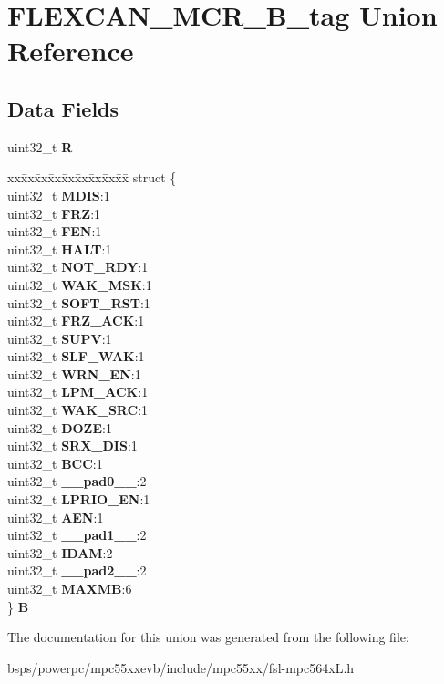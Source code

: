 \hypertarget{unionFLEXCAN__MCR__32B__tag}{}\section{F\+L\+E\+X\+C\+A\+N\+\_\+\+M\+C\+R\+\_\+B\+\_\+tag Union Reference}
\label{unionFLEXCAN__MCR__32B__tag}
\subsection*{Data Fields}
\begin{DoxyCompactItemize}
\item 
\mbox{\label{unionFLEXCAN__MCR__32B__tag_a720e2c099ae0cbb7f790905b1dbba3ff}} 
uint32\+\_\+t {\bfseries R}
\item 
\mbox{\label{unionFLEXCAN__MCR__32B__tag_a21c370a4f7a75c91a7bd3bd34af7881f}} 
\begin{tabbing}
xx\=xx\=xx\=xx\=xx\=xx\=xx\=xx\=xx\=\kill
struct \{\\
\>uint32\_t {\bfseries MDIS}:1\\
\>uint32\_t {\bfseries FRZ}:1\\
\>uint32\_t {\bfseries FEN}:1\\
\>uint32\_t {\bfseries HALT}:1\\
\>uint32\_t {\bfseries NOT\_RDY}:1\\
\>uint32\_t {\bfseries WAK\_MSK}:1\\
\>uint32\_t {\bfseries SOFT\_RST}:1\\
\>uint32\_t {\bfseries FRZ\_ACK}:1\\
\>uint32\_t {\bfseries SUPV}:1\\
\>uint32\_t {\bfseries SLF\_WAK}:1\\
\>uint32\_t {\bfseries WRN\_EN}:1\\
\>uint32\_t {\bfseries LPM\_ACK}:1\\
\>uint32\_t {\bfseries WAK\_SRC}:1\\
\>uint32\_t {\bfseries DOZE}:1\\
\>uint32\_t {\bfseries SRX\_DIS}:1\\
\>uint32\_t {\bfseries BCC}:1\\
\>uint32\_t {\bfseries \_\_pad0\_\_}:2\\
\>uint32\_t {\bfseries LPRIO\_EN}:1\\
\>uint32\_t {\bfseries AEN}:1\\
\>uint32\_t {\bfseries \_\_pad1\_\_}:2\\
\>uint32\_t {\bfseries IDAM}:2\\
\>uint32\_t {\bfseries \_\_pad2\_\_}:2\\
\>uint32\_t {\bfseries MAXMB}:6\\
\} {\bfseries B}\\

\end{tabbing}\end{DoxyCompactItemize}


The documentation for this union was generated from the following file\+:\begin{DoxyCompactItemize}
\item 
bsps/powerpc/mpc55xxevb/include/mpc55xx/fsl-\/mpc564x\+L.\+h\end{DoxyCompactItemize}
